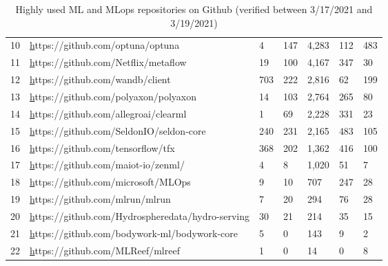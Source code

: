 \documentclass{article}
\begin{document}
\begin{table}[ht]
\begin{tabular}{lllllll}
10          & {\color[HTML]{0563C1} {\ul https://github.com/optuna/optuna}}                 & 4                 & 147             & 4,283          & 112            & 483              \\
11          & {\color[HTML]{0563C1} {\ul https://github.com/Netflix/metaflow}}              & 19                & 100             & 4,167          & 347            & 30               \\
12          & {\color[HTML]{0563C1} {\ul https://github.com/wandb/client}}                  & 703               & 222             & 2,816          & 62             & 199              \\
13          & {\color[HTML]{0563C1} {\ul https://github.com/polyaxon/polyaxon}}             & 14                & 103             & 2,764          & 265            & 80               \\
14          & {\color[HTML]{0563C1} {\ul https://github.com/allegroai/clearml}}             & 1                 & 69              & 2,228          & 331            & 23               \\
15          & {\color[HTML]{0563C1} {\ul https://github.com/SeldonIO/seldon-core}}          & 240               & 231             & 2,165          & 483            & 105              \\
16          & {\color[HTML]{0563C1} {\ul https://github.com/tensorflow/tfx}}                & 368               & 202             & 1,362          & 416            & 100              \\
17          & {\color[HTML]{0563C1} {\ul https://github.com/maiot-io/zenml/}}               & 4                 & 8               & 1,020          & 51             & 7                \\
18          & {\color[HTML]{0563C1} {\ul https://github.com/microsoft/MLOps}}               & 9                 & 10              & 707            & 247            & 28               \\
19          & {\color[HTML]{0563C1} {\ul https://github.com/mlrun/mlrun}}                   & 7                 & 20              & 294            & 76             & 28               \\
20          & {\color[HTML]{0563C1} {\ul https://github.com/Hydrospheredata/hydro-serving}} & 30                & 21              & 214            & 35             & 15               \\
21          & {\color[HTML]{0563C1} {\ul https://github.com/bodywork-ml/bodywork-core}}     & 5                 & 0               & 143            & 9              & 2                \\
22          & {\color[HTML]{0563C1} {\ul https://github.com/MLReef/mlreef}}                 & 1                 & 0               & 14             & 0              & 8               
\end{tabular}
\caption{Highly used ML and MLops repositories on Github (verified between 3/17/2021 and 3/19/2021)}
\label{tab:my-table1}
\end{table}
\end{document}
